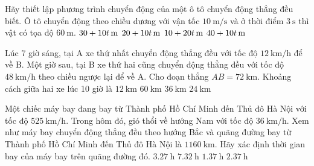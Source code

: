 \begin{ex}
	Hãy thiết lập phương trình chuyển động của một ô tô chuyển động thẳng đều biết. Ô tô chuyển động theo chiều dương với vận tốc $\SI{10}{\meter/\second}$ và ở thời điểm $\SI{3}{\second}$ thì vật có tọa độ $\SI{60}{\meter}$.
	\choice
	{\True $\xsi{30+10t}{\meter}$}
	{$\xsi{20+10t}{\meter}$}
	{$\xsi{10+20t}{\meter}$}
	{$\xsi{40+10t}{\meter}$}
\end{ex}

\begin{ex}
	Lúc 7 giờ sáng, tại A xe thứ nhất chuyển động thẳng đều với tốc độ $\SI{12}{\kilo\meter/\hour}$ để về B. Một giờ sau, tại B xe thứ hai cũng chuyển động thẳng đều với tốc độ $\SI{48}{\kilo\meter/\hour}$ theo chiều ngược lại để về A. Cho đoạn thẳng $AB=\SI{72}{\kilo\meter}$. Khoảng cách giữa hai xe lúc 10 giờ là
	\choice
	{$\SI{12}{\kilo\meter}$}
	{\True $\SI{60}{\kilo\meter}$}
	{$\SI{36}{\kilo\meter}$}
	{$\SI{24}{\kilo\meter}$}
\end{ex}

\begin{ex}
	Một chiếc máy bay đang bay từ Thành phố Hồ Chí Minh đến Thủ đô Hà Nội với tốc độ $\SI{525}{\kilo\meter/\hour}$. Trong hôm đó, gió thổi về hướng Nam với tốc độ $\SI{36}{\kilo\meter/\hour}$. Xem như máy bay chuyển động thẳng đều theo hướng Bắc và quãng đường bay từ Thành phố Hồ Chí Minh đến Thủ đô Hà Nội là $\SI{1160}{\kilo\meter}$. Hãy xác định thời gian bay của máy bay trên quãng đường đó.
	\choice
	{$\SI{3,27}{\hour}$}
	{$\SI{7,32}{\hour}$}
	{$\SI{1,37}{\hour}$}
	{\True $\SI{2,37}{\hour}$}
\end{ex}

